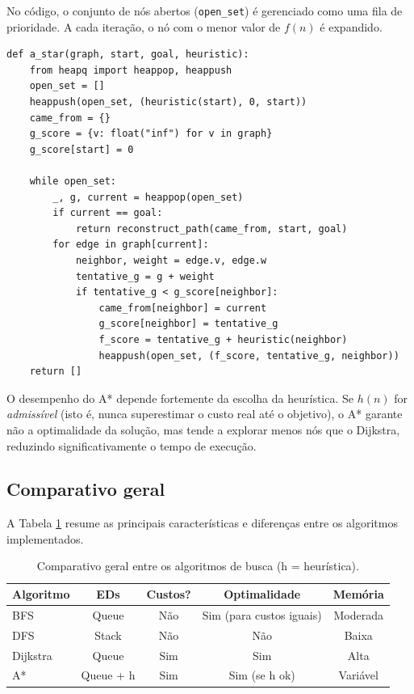\documentclass[12pt,a4paper]{article}
\begin{document}
No código, o conjunto de nós abertos (\texttt{open\_set}) é gerenciado como uma fila de prioridade. A cada iteração, o nó com o menor valor de \( f(n) \) é expandido.

\begin{lstlisting}[caption={Trecho da função A*.}]
def a_star(graph, start, goal, heuristic):
    from heapq import heappop, heappush
    open_set = []
    heappush(open_set, (heuristic(start), 0, start))
    came_from = {}
    g_score = {v: float("inf") for v in graph}
    g_score[start] = 0
    
    while open_set:
        _, g, current = heappop(open_set)
        if current == goal:
            return reconstruct_path(came_from, start, goal)
        for edge in graph[current]:
            neighbor, weight = edge.v, edge.w
            tentative_g = g + weight
            if tentative_g < g_score[neighbor]:
                came_from[neighbor] = current
                g_score[neighbor] = tentative_g
                f_score = tentative_g + heuristic(neighbor)
                heappush(open_set, (f_score, tentative_g, neighbor))
    return []
\end{lstlisting}

O desempenho do A* depende fortemente da escolha da heurística. 
Se \( h(n) \) for \textit{admissível} (isto é, nunca superestimar o custo real até o objetivo), o A* garante não a optimalidade da solução, mas tende a explorar menos nós que o Dijkstra, reduzindo significativamente o tempo de execução.

\subsection{Comparativo geral}
A Tabela \ref{tab:comparativo} resume as principais características e diferenças entre os algoritmos implementados.

\begin{table}[H]
\centering
\caption{Comparativo geral entre os algoritmos de busca (h = heurística).}
\label{tab:comparativo}
\begin{tabular}{|l|c|c|c|c|}
\hline
\textbf{Algoritmo} & \textbf{EDs} & \textbf{Custos?} & \textbf{Optimalidade} & \textbf{Memória}\\
\hline
BFS & Queue & Não & Sim (para custos iguais) & Moderada \\
\hline
DFS & Stack & Não & Não & Baixa \\
\hline
Dijkstra & Queue & Sim & Sim & Alta \\
\hline
A* & Queue + h & Sim & Sim (se h ok) & Variável \\
\hline
\end{tabular}
\end{table}
\end{document}
